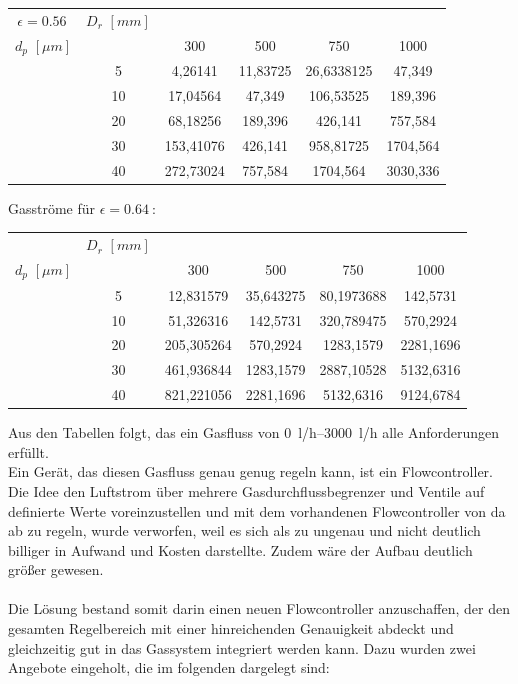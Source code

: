 \begin{tabular}{c|c|c|c|c|c}
$\epsilon = \SI{0,56}{}$	&   $D_r$ $[mm]$    &  &       &       &  \\
$d_p$ $[\mu m]$	&       & 300   & 500   & 750   & 1000 \\
	\hline
	 & 5     & 4,26141 & 11,83725 & 26,6338125 & 47,349 \\
	& 10    & 17,04564 & 47,349 & 106,53525 & 189,396 \\
	& 20    & 68,18256 & 189,396 & 426,141 & 757,584 \\
	& 30    & 153,41076 & 426,141 & 958,81725 & 1704,564 \\
	& 40    & 272,73024 & 757,584 & 1704,564 & 3030,336 \\
\end{tabular}

\vspace{1cm}

Gasströme für $\epsilon = \SI{0,64}{}$:

\begin{tabular}{c|c|c|c|c|c}
	&   $D_r$ $[mm]$    &  &       &       &  \\
	$d_p$ $[\mu m]$	&       & 300   & 500   & 750   & 1000 \\
	\hline
& 5     & 12,831579 & 35,643275 & 80,1973688 & 142,5731 \\
& 10    & 51,326316 & 142,5731 & 320,789475 & 570,2924 \\
& 20    & 205,305264 & 570,2924 & 1283,1579 & 2281,1696 \\
& 30    & 461,936844 & 1283,1579 & 2887,10528 & 5132,6316 \\
& 40    & 821,221056 & 2281,1696 & 5132,6316 & 9124,6784 \\
\end{tabular} 


\vspace{0.5cm}

Aus den Tabellen folgt, das ein Gasfluss von \SIrange{0}{3000}{l/h} alle Anforderungen erfüllt. \\
Ein Gerät, das diesen Gasfluss genau genug regeln kann, ist ein Flowcontroller.
Die Idee den Luftstrom über mehrere Gasdurchflussbegrenzer und Ventile auf definierte Werte voreinzustellen und mit dem vorhandenen Flowcontroller von da ab zu regeln, wurde verworfen, weil es sich als zu ungenau und nicht deutlich billiger in Aufwand und Kosten darstellte. Zudem wäre der Aufbau deutlich größer gewesen. \\
\hfill \\
Die Lösung bestand somit darin einen neuen Flowcontroller anzuschaffen, der den gesamten Regelbereich mit einer hinreichenden Genauigkeit abdeckt und gleichzeitig gut in das Gassystem integriert werden kann. Dazu wurden zwei Angebote eingeholt, die im folgenden dargelegt sind:


